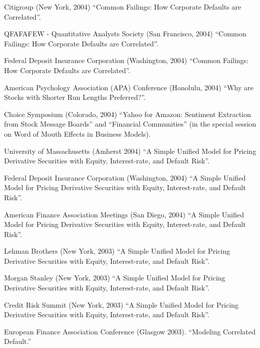 \documentclass{article}
\begin{document}
\begin{etaremune}
{\item Citigroup (New York, 2004) 
  ``Common Failings: How Corporate Defaults are Correlated''.

\item QFAFAFEW - Quantitative Analysts Society (San Francisco, 2004)
  ``Common Failings: How Corporate Defaults are Correlated''.


\item Federal Deposit Insurance Corporation (Washington, 2004)  
``Common Failings: How Corporate Defaults are Correlated''.

  
\item American Psychology Association (APA) Conference (Honolulu,
  2004) ``Why are Stocks with Shorter Run Lengths Preferred?''.
  
\item Choice Symposium (Colorado, 2004) ``Yahoo for Amazon: Sentiment
  Extraction from Stock Message Boards'' and ``Financial Communities''
  (in the special session on Word of Mouth Effects in Business
  Models).

\item University of Massachusetts (Amherst 2004) 
``A Simple Unified Model for Pricing Derivative Securities with
Equity, Interest-rate, and Default Risk''.

\item Federal Deposit Insurance Corporation (Washington, 2004)  
``A Simple Unified Model for Pricing Derivative Securities with
Equity, Interest-rate, and Default Risk''.


\item American Finance Association Meetings (San Diego, 2004)  
``A Simple Unified Model for Pricing Derivative Securities with
Equity, Interest-rate, and Default Risk''.


\item Lehman Brothers (New York, 2003)
``A Simple Unified Model for Pricing Derivative Securities with
Equity, Interest-rate, and Default Risk''.

\item Morgan Stanley (New York, 2003)
``A Simple Unified Model for Pricing Derivative Securities with
Equity, Interest-rate, and Default Risk''.


\item Credit Risk Summit (New York, 2003)
``A Simple Unified Model for Pricing Derivative Securities with
Equity, Interest-rate, and Default Risk''.


\item European Finance Association Conference (Glasgow 2003).
``Modeling Correlated Default.''

}
\end{etaremune}
\end{document}

